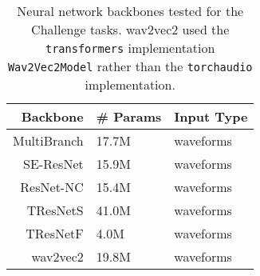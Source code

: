 
\begin{table}[!htp]
\centering
\begin{tabular}{r|l|l}
    \hline
    Backbone & \# Params & Input Type \\ \hline
    MultiBranch \cite{Kang_2022_cinc2021_iop} & 17.7M & waveforms \\
    SE-ResNet \cite{Kang_2022_cinc2021_iop} & 15.9M & waveforms  \\
    ResNet-NC \cite{ribeiro2020automatic} & 15.4M & waveforms  \\
    TResNetS \cite{Kang_2022_cinc2021_iop} & 41.0M & waveforms  \\
    TResNetF \cite{Kang_2022_cinc2021_iop} & 4.0M & waveforms  \\
    wav2vec2 \cite{baevski2020wav2vec} & 19.8M & waveforms \\ \hline
\end{tabular}
\caption{Neural network backbones tested for the Challenge tasks. wav2vec2 used the \texttt{transformers} implementation \texttt{Wav2Vec2Model} rather than the \texttt{torchaudio} implementation.}
\label{tab:nn_backbone}
\end{table}

